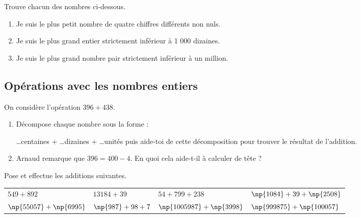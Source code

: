 \documentclass[a4paper,10pt]{report}
\begin{document}
\begin{ex}
Trouve chacun des nombres ci-dessous.

\begin{enumerate}
\item Je suis le plus petit nombre de quatre chiffres différents non nuls.
\item Je suis le plus grand entier strictement inférieur à 1 000 dizaines.
\item Je suis le plus grand nombre pair strictement inférieur à un million.
\end{enumerate}
\end{ex}

\subsection*{Opérations avec les nombres entiers}

\begin{ex}
On considère l'opération $396+438$.
\begin{enumerate}
\item Décompose chaque nombre sous la forme :

 \dots centaines + \dots dizaines + \dots unités puis aide-toi de cette décomposition pour trouver le résultat de l'addition.
\item Arnaud remarque que $396=400-4$. En quoi cela aide-t-il à calculer de tête ?
\end{enumerate}
\end{ex}

\begin{ex}
Pose et effectue les additions suivantes.

\begin{enumerate}
\begin{tabular}{m{4cm}m{4cm}m{4cm}m{4cm}}
\item $549 + 892$&
\item $13 184 + 39$&
\item $54 + 799 + 238$&
\item $\np{1 084} + 39 + \np{2 508}$\\
\item $\np{55 057} + \np{6 995}$&
\item $\np{987} + 98 + 7$&
\item $\np{1 005 987} + \np{3 998}$&
\item $\np{999 875} + \np{100 057}$\\
\end{tabular}
\end{enumerate}
\end{ex}
\end{document}
